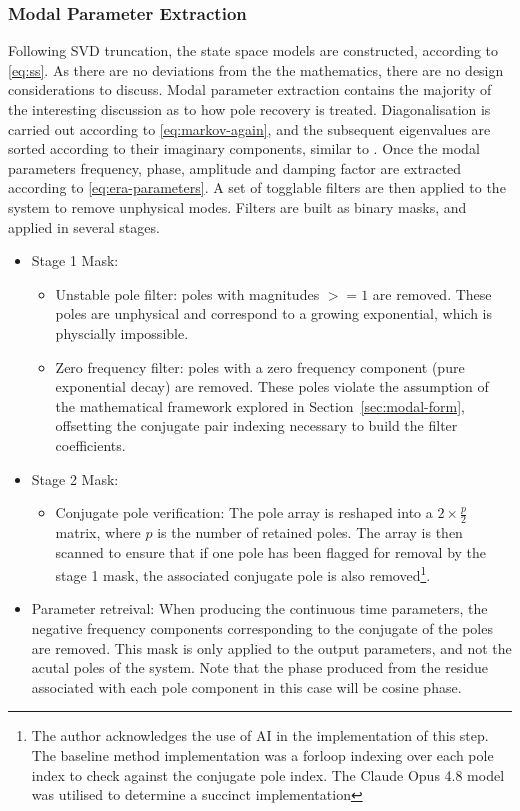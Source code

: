 \subsubsection{Modal Parameter Extraction}
Following SVD truncation, the state space models are constructed, according to \eqref{eq:ss}. As there are no deviations from the the mathematics, there are no design considerations to discuss. Modal parameter extraction contains the majority of the interesting discussion as to how pole recovery is treated.
Diagonalisation is carried out according to \eqref{eq:markov-again}, and the subsequent eigenvalues are sorted according to their imaginary components, similar to \cite{pyyeti}.
Once the modal parameters frequency, phase, amplitude and damping factor are extracted according to \eqref{eq:era-parameters}. A set of togglable filters are then applied to the system to remove unphysical modes. Filters are built as binary masks, and applied in several stages.
\begin{itemize}
    \item Stage 1 Mask:
    \begin{itemize}
        \item Unstable pole filter: poles with magnitudes $>=1$ are removed. These poles are unphysical and correspond to a growing exponential, which is physcially impossible.
        \item Zero frequency filter: poles with a zero frequency component (pure exponential decay) are removed. These poles violate the assumption of the mathematical framework explored in Section~\ref{sec:modal-form}, offsetting the conjugate pair indexing necessary to build the filter coefficients.
    \end{itemize}
    \item Stage 2 Mask:
    \begin{itemize}
        \item Conjugate pole verification: The pole array is reshaped into a $2\times\frac{p}{2}$ matrix, where $p$ is the number of retained poles. The array is then scanned to ensure that if one pole has been flagged for removal by the stage 1 mask, the associated conjugate pole is also removed\footnote{The author acknowledges the use of AI in the implementation of this step. The baseline method implementation was a forloop indexing over each pole index to check against the conjugate pole index. The Claude Opus 4.8 model was utilised to determine a succinct implementation}.
    \end{itemize}
    \item Parameter retreival: When producing the continuous time parameters, the negative frequency components corresponding to the conjugate of the poles are removed. This mask is only applied to the output parameters, and not the acutal poles of the system. Note that the phase produced from the residue associated with each pole component in this case will be cosine phase.
\end{itemize}

